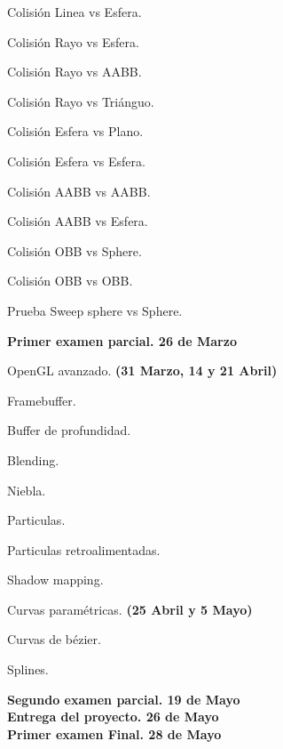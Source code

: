 \documentclass[a4paper,11pt]{article}
\theoremstyle{mytheor}
\begin{document}
\begin{legal}
\begin{legal}
		\item Colisión Linea vs Esfera.
		\item Colisión Rayo vs Esfera.
		\item Colisión Rayo vs AABB.
		\item Colisión Rayo vs Triánguo.
		\item Colisión Esfera vs Plano.
		\item Colisión Esfera vs Esfera.
		\item Colisión AABB vs AABB.
		\item Colisión AABB vs Esfera.
		\item Colisión OBB vs Sphere.
		\item Colisión OBB vs OBB.
		\item Prueba Sweep sphere vs Sphere.
	\end{legal}
	\textbf{Primer examen parcial. 26 de Marzo}
	\item OpenGL avanzado. \textbf{(31 Marzo, 14 y 21 Abril)}
	\begin{legal}
		\item Framebuffer.
		\item Buffer de profundidad.
		\item Blending.
		\item Niebla.
		\item Particulas.
		\item Particulas retroalimentadas.
		\item Shadow mapping.
	\end{legal}	
	\item Curvas paramétricas. \textbf{(25 Abril y 5 Mayo)}
	\begin{legal}
		\item Curvas de bézier.
		\item Splines.
	\end{legal}
	\textbf{Segundo examen parcial. 19 de Mayo}
	\\ \textbf{Entrega del proyecto. 26 de Mayo }
	\\ \textbf{Primer examen Final. 28 de Mayo}
	
\end{legal}
\end{document}
